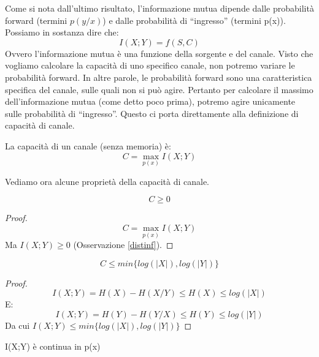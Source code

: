 Come si nota dall'ultimo risultato, l'informazione mutua dipende dalle probabilità forward (termini $p(y/x)$) e dalle probabilità di ``ingresso'' (termini p(x)).
Possiamo in sostanza dire che:
\[
 I(X;Y)=f(S,C)
\]
Ovvero l'informazione mutua è una funzione della sorgente e del canale. Visto che vogliamo calcolare la capacità di uno specifico canale, non potremo variare le probabilità forward. In altre parole, le probabilità forward sono una caratteristica specifica del canale, sulle quali non si può agire. Pertanto per calcolare il massimo dell'informazione mutua (come detto poco prima), potremo agire 
unicamente sulle probabilità di ``ingresso''. Questo ci porta direttamente alla definizione di capacità di canale.

\begin{definizione}
 La capacità di un canale (senza memoria) è:
 \[
  C=\max_{p(x)} I(X;Y)
 \]

\end{definizione}

\bigskip

\noindent
Vediamo ora alcune proprietà della capacità di canale.

\begin{osservazione}
\[
 C \ge 0
\]
 \begin{proof}
  \[
   C=\max_{p(x)} I(X;Y)
  \]
  Ma $I(X;Y) \ge 0$ (Osservazione \ref{distinf}).
 \end{proof}
\end{osservazione}

\bigskip

\begin{osservazione}
\[
 C \le min\{log(|X|), log(|Y|)\}
\]
 \begin{proof}
  \[
   I(X;Y)=H(X)-H(X/Y) \le H(X) \le log(|X|)
  \]
  E:
  \[
   I(X;Y)=H(Y)-H(Y/X) \le H(Y) \le log(|Y|)
  \]
  Da cui $I(X;Y) \le min\{log(|X|), log(|Y|)\}$
 \end{proof}
\end{osservazione}

\bigskip

\begin{osservazione}
\mbox{}

 I(X;Y) è continua in p(x)
\end{osservazione}

